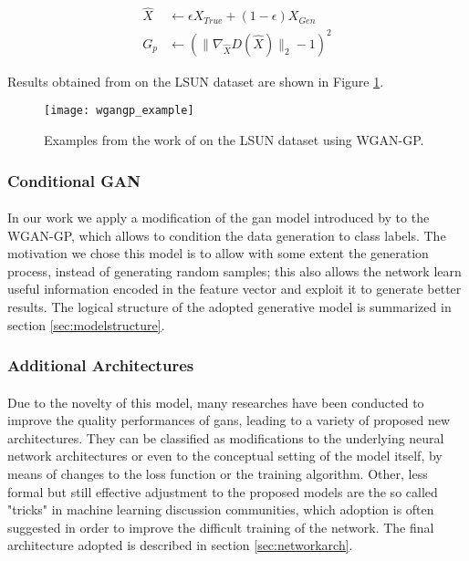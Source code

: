 \begin{equation}
\label{eq:gp}
\begin{split}
\hat{X} & \gets \epsilon X_{True} + (1-\epsilon) X_{Gen} \\
G_p & \gets (\| \nabla_{\hat{X}}D(\hat{X}) \|_2 - 1 )^2
\end{split}
\end{equation}

Results obtained from \citeauthor{wgangp} on the LSUN dataset are shown in Figure \ref{fig:wgangp}.
\begin{figure}[h!]
	\begin{center}
		\texttt{[image: wgangp\_example]}
	\end{center}
	
	\captionsetup{width=1\linewidth}
	\caption[Samples from WGAN-GP, \citeauthor{wgangp}]{Examples from the work of \citeauthor{wgangp} on the LSUN dataset using WGAN-GP. \cite[p.8]{wgangp}}
	\label{fig:wgangp}
	\medskip
\end{figure}

\subsubsection{Conditional GAN}
\paragraph{} In our work we apply a modification of the \gls{gan} model introduced by \citeauthor{conditionalgan} \cite{conditionalgan} to the WGAN-GP, which allows to condition the data generation to class labels. The motivation we chose this model is to allow with some extent the generation process, instead of generating random samples; this also allows the network learn useful information encoded in the feature vector and exploit it to generate better results. The logical structure of the adopted generative model is summarized in section \ref{sec:modelstructure}.


\subsubsection{Additional Architectures}
\paragraph{} Due to the novelty of this model, many researches have been conducted to improve the quality performances of \glspl{gan}, leading to a variety of proposed new architectures. They can be classified as modifications to the underlying neural network architectures or even to the conceptual setting of the model itself, by means of changes to the loss function or the training algorithm. Other, less formal but still effective adjustment to the proposed models are the so called "tricks" in machine learning discussion communities, which adoption is often suggested in order to improve the difficult training of the network. The final architecture adopted is described in section \ref{sec:networkarch}.


